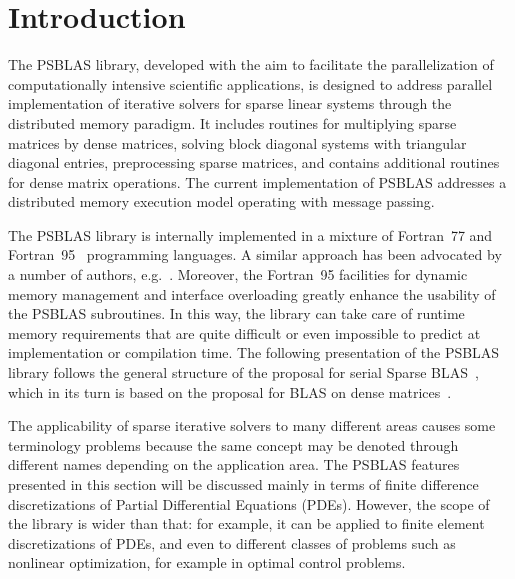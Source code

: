 \section{Introduction}

The PSBLAS library, developed with the aim to facilitate the
parallelization of computationally intensive scientific applications,
is designed to address parallel implementation of iterative solvers
for sparse linear systems through the distributed memory paradigm.  It
includes routines for multiplying sparse matrices by dense matrices,
solving block diagonal systems with triangular diagonal entries,
preprocessing sparse matrices, and contains additional routines for
dense matrix operations.  The current implementation of PSBLAS
addresses a distributed memory execution model operating with message
passing. 

The PSBLAS library is internally implemented in a mixture of
Fortran~77 and Fortran~95~\cite{metcalf} programming languages. A
similar approach has been advocated by a number of authors,
e.g.~\cite{machiels}.  Moreover, the Fortran~95 facilities for dynamic
memory management and interface overloading greatly enhance the usability of the PSBLAS
subroutines. In this way, the library can take care of runtime memory
requirements that are quite difficult or even impossible to predict at
implementation or compilation time.  The following presentation of the
PSBLAS library follows the general structure of the proposal for
serial Sparse BLAS~\cite{sblas97,sblas02}, which in its turn is based on the
proposal for BLAS on dense matrices~\cite{BLAS1,BLAS2,BLAS3}.

The applicability of sparse iterative solvers to many different areas
causes some terminology problems because the same concept may be
denoted through different names depending on the application area. The
PSBLAS features presented in this section will be discussed mainly in terms of finite
difference discretizations of Partial Differential Equations (PDEs).
However, the scope of the library is wider than that: for example, it
can be applied to finite element discretizations of PDEs, and even to
different classes of problems such as nonlinear optimization, for
example in optimal control problems.

